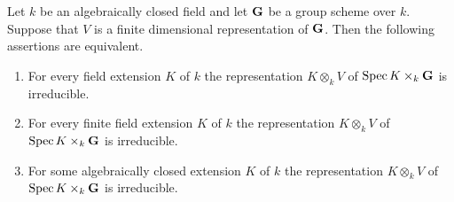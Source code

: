 \begin{theorem}\label{theorem:absolutely_irreducible}
Let $k$ be an algebraically closed field and let $\mathbf{G}$ be a group scheme over $k$. Suppose that $V$ is a finite dimensional representation of $\mathbf{G}$. Then the following assertions are equivalent.
\begin{enumerate}[label=\emph{\textbf{(\roman*)}}, leftmargin=3.0em]
\item For every field extension $K$ of $k$ the representation $K\otimes_kV$ of $\mathrm{Spec}\, K\times_k\mathbf{G}$ is irreducible.
\item For every finite field extension $K$ of $k$ the representation $K\otimes_kV$ of $\mathrm{Spec}\, K\times_k\mathbf{G}$ is irreducible.
\item For some algebraically closed extension $K$ of $k$ the representation $K\otimes_kV$ of $\mathrm{Spec}\, K\times_k\mathbf{G}$ is irreducible.
\end{enumerate}
\end{theorem}
